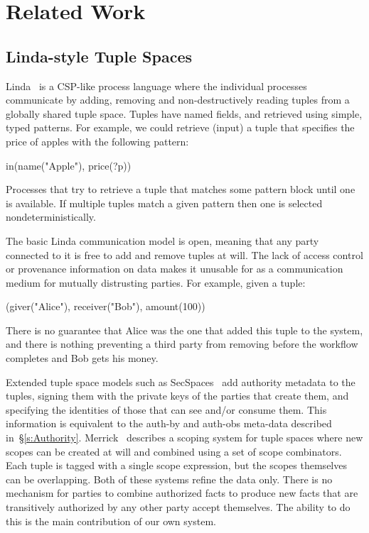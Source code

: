 
\clearpage{}

\label{s:Related}
\section{Related Work}

\subsection{Linda-style Tuple Spaces}
Linda~\cite{Gelernter1985:Linda} is a CSP-like process language where the individual processes communicate by adding, removing and non-destructively reading tuples from a globally shared tuple space. Tuples have named fields, and retrieved using simple, typed patterns. For example, we could retrieve (input) a tuple that specifies the price of apples with the following pattern:
\begin{code}
   in(name("Apple"), price(?p))
\end{code}
Processes that try to retrieve a tuple that matches some pattern block until one is available. If multiple tuples match a given pattern then one is selected nondeterministically.

The basic Linda communication model is open, meaning that any party connected to it is free to add and remove tuples at will. The lack of access control or provenance information on data makes it unusable for as a communication medium for mutually distrusting parties. For example, given a tuple:
\begin{code}
   (giver("Alice"), receiver("Bob"), amount(100))
\end{code}
There is no guarantee that Alice was the one that added this tuple to the system, and there is nothing preventing a third party from removing before the workflow completes and Bob gets his money.

Extended tuple space models such as SecSpaces~\cite{Busi2003:SecSpaces} add authority metadata to the tuples, signing them with the private keys of the parties that create them, and specifying the identities of those that can see and/or consume them. This information is equivalent to the auth-by and auth-obs meta-data described in~\S\ref{s:Authority}. Merrick~\cite{Merrick2000:Scopes} describes a scoping system for tuple spaces where new scopes can be created at will and combined using a set of scope combinators. Each tuple is tagged with a single scope expression, but the scopes themselves can be overlapping. Both of these systems refine the data only. There is no mechanism for parties to combine authorized facts to produce new facts that are transitively authorized by any other party accept themselves. The ability to do this is the main contribution of our own system.


